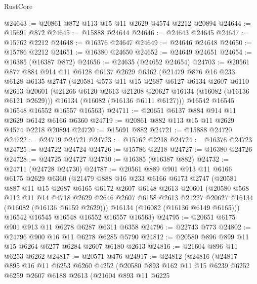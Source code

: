 \begin{lexlean}{RustCore}
\begin{coremodule}
@24643 := @20861 @872 @113 @15 @11 @2629 @4574 @2212 @20894
@24644 := @15691 @872
@24645 := @15888 @24644
@24646 := @24643 @24645
@24647 := @15762 @2212
@24648 := @16376 @24647
@24649 := @24646 @24648
@24650 := @15786 @2212
@24651 := @16380 @24650
@24652 := @24649 @24651
@24654 := @16385 (@16387 @872)
@24656 := @24635 (@24652 @24654)
@24703 := @20561
    @877
    @884
    @914
    @11
    @6128
    @6137
    @2629
    @6362
    (@21479
      @876
      @16
      @233
      @6128
      @6135
      @2747
      (@20581
        @573
        @11
        @15
        @2687
        @6127
        @6134
        @2607
        @6110
        @2613
        @20601
        (@21266 @6120 @2613 @21208 @20627 @16134 (@16082 (@16136 @6121 @2629)))
        @16134
        (@16082 (@16136 @6111 @6127)))
      @16542
      @16545
      @16548
      @16552
      @16557
      @16563)
@24711 := @20651 @6137 @884 @914 @11 @2629 @6142 @6166 @6360
@24719 := @20861 @882 @113 @15 @11 @2629 @4574 @2218 @20894
@24720 := @15691 @882
@24721 := @15888 @24720
@24722 := @24719 @24721
@24723 := @15762 @2218
@24724 := @16376 @24723
@24725 := @24722 @24724
@24726 := @15786 @2218
@24727 := @16380 @24726
@24728 := @24725 @24727
@24730 := @16385 (@16387 @882)
@24732 := @24711 (@24728 @24730)
@24787 := @20561
    @889
    @901
    @913
    @11
    @6166
    @6175
    @2629
    @6360
    (@21479
      @888
      @16
      @233
      @6166
      @6173
      @2747
      (@20581
        @887
        @11
        @15
        @2687
        @6165
        @6172
        @2607
        @6148
        @2613
        @20601
        (@20580
          @568
          @112
          @11
          @14
          @4718
          @2629
          @2646
          @2607
          @6158
          @2613
          @21227
          @20627
          @16134
          (@16082 (@16136 @6159 @2629)))
        @16134
        (@16082 (@16136 @6149 @6165)))
      @16542
      @16545
      @16548
      @16552
      @16557
      @16563)
@24795 := @20651 @6175 @901 @913 @11 @6278 @6287 @6311 @6358
@24796 := @22743 @773
@24802 := @24796 @900 @16 @11 @6278 @6285 @5790
@24812 := @20580 @896 @899 @11 @15 @6264 @6277 @6284 @2607 @6180 @2613
@24816 := @21604 @896 @11 @6253 @6262
@24817 := @20571 @476
@24917 := @24812
    (@24816
      (@24817
        @895
        @16
        @11
        @6253
        @6260
        @4252
        (@20580
          @893
          @162
          @11
          @15
          @6239
          @6252
          @6259
          @2607
          @6188
          @2613
          (@21604
            @893
            @11
            @6225

\end{coremodule}
\end{lexlean}
